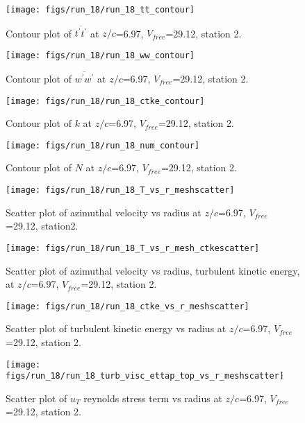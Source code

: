 \begin{figure}[H]
\centering
\texttt{[image: figs/run\_18/run\_18\_tt\_contour]}
\caption{Contour plot of $\overline{t^\prime t^\prime}$ at $z/c$=6.97, $V_{free}$=29.12, station 2.}
\end{figure}


\begin{figure}[H]
\centering
\texttt{[image: figs/run\_18/run\_18\_ww\_contour]}
\caption{Contour plot of $\overline{w^\prime w^\prime}$ at $z/c$=6.97, $V_{free}$=29.12, station 2.}
\end{figure}


\begin{figure}[H]
\centering
\texttt{[image: figs/run\_18/run\_18\_ctke\_contour]}
\caption{Contour plot of $k$ at $z/c$=6.97, $V_{free}$=29.12, station 2.}
\end{figure}


\begin{figure}[H]
\centering
\texttt{[image: figs/run\_18/run\_18\_num\_contour]}
\caption{Contour plot of $N$ at $z/c$=6.97, $V_{free}$=29.12, station 2.}
\end{figure}


\begin{figure}[H]
\centering
\texttt{[image: figs/run\_18/run\_18\_T\_vs\_r\_meshscatter]}
\caption{Scatter plot of azimuthal velocity vs radius at $z/c$=6.97, $V_{free}$=29.12, station2.}
\end{figure}


\begin{figure}[H]
\centering
\texttt{[image: figs/run\_18/run\_18\_T\_vs\_r\_mesh\_ctkescatter]}
\caption{Scatter plot of azimuthal velocity vs radius, turbulent kinetic energy, at $z/c$=6.97, $V_{free}$=29.12, station 2.}
\end{figure}


\begin{figure}[H]
\centering
\texttt{[image: figs/run\_18/run\_18\_ctke\_vs\_r\_meshscatter]}
\caption{Scatter plot of turbulent kinetic energy vs radius at $z/c$=6.97, $V_{free}$=29.12, station 2.}
\end{figure}


\begin{figure}[H]
\centering
\texttt{[image: figs/run\_18/run\_18\_turb\_visc\_ettap\_top\_vs\_r\_meshscatter]}
\caption{Scatter plot of $
u_T$ reynolds stress term vs radius at $z/c$=6.97, $V_{free}$=29.12, station 2.}
\end{figure}



